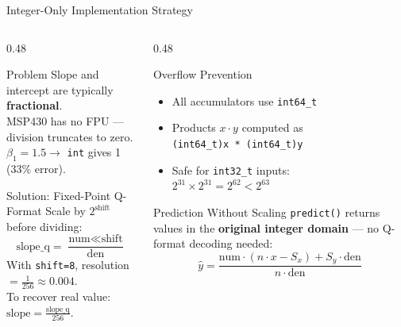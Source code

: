 \documentclass[aspectratio=169, 10pt]{beamer}
\begin{document}
\begin{frame}{Integer-Only Implementation Strategy}
\begin{columns}[T]
\begin{column}{0.48\textwidth}
\begin{block}{Problem}
Slope and intercept are typically \textbf{fractional}.\\
MSP430 has no FPU --- division truncates to zero.\\
$\beta_1 = 1.5 \rightarrow$ \texttt{int} gives 1 (33\% error).
\end{block}

\vspace{0.3em}
\begin{block}{Solution: Fixed-Point Q-Format}
Scale by $2^{\text{shift}}$ before dividing:
\[
  \text{slope\_q} = \frac{\text{num} \ll \text{shift}}{\text{den}}
\]
With \texttt{shift=8}, resolution $= \frac{1}{256} \approx 0.004$.\\[0.3em]
To recover real value: $\text{slope} = \frac{\text{slope\_q}}{256}$.
\end{block}
\end{column}

\begin{column}{0.48\textwidth}
\begin{block}{Overflow Prevention}
\begin{itemize}
  \item All accumulators use \texttt{int64\_t}
  \item Products $x \cdot y$ computed as\\
        \texttt{(int64\_t)x * (int64\_t)y}
  \item Safe for \texttt{int32\_t} inputs:\\
        $2^{31} \times 2^{31} = 2^{62} < 2^{63}$
\end{itemize}
\end{block}

\vspace{0.3em}
\begin{block}{Prediction Without Scaling}
\texttt{predict()} returns values in the \textbf{original integer
domain} --- no Q-format decoding needed:
\[
  \hat{y} = \frac{\text{num} \cdot (n \cdot x - S_x) + S_y \cdot \text{den}}{n \cdot \text{den}}
\]
\end{block}
\end{column}
\end{columns}
\end{frame}
\end{document}
